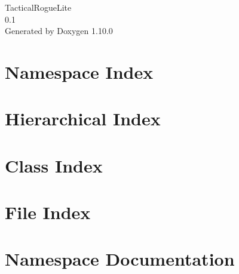 \documentclass[twoside]{book}
\newcommand{\+}{\discretionary{\mbox{\scriptsize$\hookleftarrow$}}{}{}}
\newcommand{\clearemptydoublepage}{%
    \newpage{\pagestyle{empty}\cleardoublepage}%
  }
\begin{document}
  \raggedbottom
    \hypersetup{pageanchor=false,
                bookmarksnumbered=true,
                pdfencoding=unicode
               }
  \begin{titlepage}
  \vspace*{7cm}
  \begin{center}%
  {\Large Tactical\+Rogue\+Lite}\\
  [1ex]\large 0.\+1 \\
  \vspace*{1cm}
  {\large Generated by Doxygen 1.10.0}\\
  \end{center}
  \end{titlepage}
  \clearemptydoublepage
  \tableofcontents
  \clearemptydoublepage
  \hypersetup{pageanchor=true}

\chapter{Namespace Index}

\chapter{Hierarchical Index}

\chapter{Class Index}

\chapter{File Index}

\chapter{Namespace Documentation}

\end{document}
